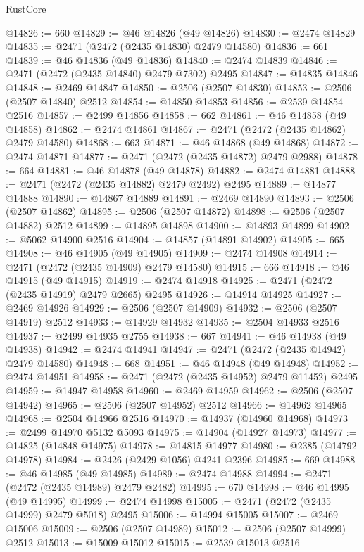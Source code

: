 \begin{lexlean}{RustCore}
\begin{coremodule}
@14826 := 660
@14829 := @46 @14826 (@49 @14826)
@14830 := @2474 @14829
@14835 := @2471 (@2472 (@2435 @14830) @2479 @14580)
@14836 := 661
@14839 := @46 @14836 (@49 @14836)
@14840 := @2474 @14839
@14846 := @2471 (@2472 (@2435 @14840) @2479 @7302) @2495
@14847 := @14835 @14846
@14848 := @2469 @14847
@14850 := @2506 (@2507 @14830)
@14853 := @2506 (@2507 @14840) @2512
@14854 := @14850 @14853
@14856 := @2539 @14854 @2516
@14857 := @2499 @14856
@14858 := 662
@14861 := @46 @14858 (@49 @14858)
@14862 := @2474 @14861
@14867 := @2471 (@2472 (@2435 @14862) @2479 @14580)
@14868 := 663
@14871 := @46 @14868 (@49 @14868)
@14872 := @2474 @14871
@14877 := @2471 (@2472 (@2435 @14872) @2479 @2988)
@14878 := 664
@14881 := @46 @14878 (@49 @14878)
@14882 := @2474 @14881
@14888 := @2471 (@2472 (@2435 @14882) @2479 @2492) @2495
@14889 := @14877 @14888
@14890 := @14867 @14889
@14891 := @2469 @14890
@14893 := @2506 (@2507 @14862)
@14895 := @2506 (@2507 @14872)
@14898 := @2506 (@2507 @14882) @2512
@14899 := @14895 @14898
@14900 := @14893 @14899
@14902 := @5062 @14900 @2516
@14904 := @14857 (@14891 @14902)
@14905 := 665
@14908 := @46 @14905 (@49 @14905)
@14909 := @2474 @14908
@14914 := @2471 (@2472 (@2435 @14909) @2479 @14580)
@14915 := 666
@14918 := @46 @14915 (@49 @14915)
@14919 := @2474 @14918
@14925 := @2471 (@2472 (@2435 @14919) @2479 @2665) @2495
@14926 := @14914 @14925
@14927 := @2469 @14926
@14929 := @2506 (@2507 @14909)
@14932 := @2506 (@2507 @14919) @2512
@14933 := @14929 @14932
@14935 := @2504 @14933 @2516
@14937 := @2499 @14935 @2755
@14938 := 667
@14941 := @46 @14938 (@49 @14938)
@14942 := @2474 @14941
@14947 := @2471 (@2472 (@2435 @14942) @2479 @14580)
@14948 := 668
@14951 := @46 @14948 (@49 @14948)
@14952 := @2474 @14951
@14958 := @2471 (@2472 (@2435 @14952) @2479 @11452) @2495
@14959 := @14947 @14958
@14960 := @2469 @14959
@14962 := @2506 (@2507 @14942)
@14965 := @2506 (@2507 @14952) @2512
@14966 := @14962 @14965
@14968 := @2504 @14966 @2516
@14970 := @14937 (@14960 @14968)
@14973 := @2499 @14970 @5132 @5093
@14975 := @14904 (@14927 @14973)
@14977 := @14825 (@14848 @14975)
@14978 := @14815 @14977
@14980 := @2385 (@14792 @14978)
@14984 := @2426 (@2429 @1056) @4241 @2396
@14985 := 669
@14988 := @46 @14985 (@49 @14985)
@14989 := @2474 @14988
@14994 := @2471 (@2472 (@2435 @14989) @2479 @2482)
@14995 := 670
@14998 := @46 @14995 (@49 @14995)
@14999 := @2474 @14998
@15005 := @2471 (@2472 (@2435 @14999) @2479 @5018) @2495
@15006 := @14994 @15005
@15007 := @2469 @15006
@15009 := @2506 (@2507 @14989)
@15012 := @2506 (@2507 @14999) @2512
@15013 := @15009 @15012
@15015 := @2539 @15013 @2516

\end{coremodule}
\end{lexlean}
